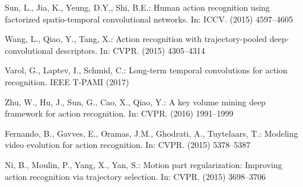 \documentclass[runningheads,a4paper]{llncs}
\begin{document}
\begin{thebibliography}{10}
	Sun, L., Jia, K., Yeung, D.Y., Shi, B.E.:
	\newblock Human action recognition using factorized spatio-temporal
	convolutional networks.
	\newblock In: ICCV. (2015)  4597--4605

	Wang, L., Qiao, Y., Tang, X.:
	\newblock Action recognition with trajectory-pooled deep-convolutional
	descriptors.
	\newblock In: CVPR. (2015)  4305--4314

	Varol, G., Laptev, I., Schmid, C.:
	\newblock Long-term temporal convolutions for action recognition.
	\newblock IEEE T-PAMI (2017)

	Zhu, W., Hu, J., Sun, G., Cao, X., Qiao, Y.:
	\newblock A key volume mining deep framework for action recognition.
	\newblock In: CVPR. (2016)  1991--1999

	Fernando, B., Gavves, E., Oramas, J.M., Ghodrati, A., Tuytelaars, T.:
	\newblock Modeling video evolution for action recognition.
	\newblock In: CVPR. (2015)  5378--5387

	Ni, B., Moulin, P., Yang, X., Yan, S.:
	\newblock Motion part regularization: Improving action recognition via
	trajectory selection.
	\newblock In: CVPR. (2015)  3698--3706

\end{thebibliography}

%
%
%
\end{document}
